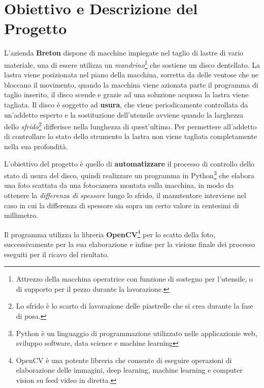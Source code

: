\documentclass[a4paper, notitlepage, 12pt]{article}
\begin{document}
    \section{Obiettivo e Descrizione  del Progetto}\par
        \noindent L'azienda \textbf{Breton} dispone di macchine impiegate nel taglio di lastre di vario materiale,
        una di essere utilizza un \emph{mandrino}\footnote[0]{\indent Attrezzo della macchina operatrice con funzione di sostegno per l'utensile, o di supporto per il pezzo durante la lavorazione.} che sostiene un disco dentellato.
        La lastra viene posizionata nel piano della macchina, sorretta da delle ventose che ne bloccano il movimento,
        quando la macchina viene azionata parte il programma di taglio inserito, il disco scende e grazie ad una
        soluzione acquosa la lastra viene tagliata. Il disco è soggetto ad \textbf{usura}, che viene periodicamente controllata da un'addetto esperto e la 
        sostituzione dell'utensile avviene quando la larghezza dello \emph{sfrido}\footnote[1]{\indent Lo sfrido è lo scarto di lavorazione delle piastrelle che si crea durante la fase di posa.} differisce
        nella lunghezza di quest'ultimo. Per permettere all'addetto di controllare lo stato dello strumento la lastra
        non viene tagliata completamente nella sua profondità.\par
        \noindent L'obiettivo del progetto è quello di \textbf{automatizzare} il processo di controllo dello stato di usura 
        del disco, quindi realizzare un programma in Python\footnote[2]{\indent Python è un linguaggio di programmazione utilizzato nelle applicazionie web, sviluppo software, data science e machine learning} che elabora una foto 
        scattata da una fotocamera montata sulla macchina, in modo da ottenere la \emph{differenza di spessore} lungo lo sfrido, 
        il manutentore interviene nel caso in cui la differenza di spessore sia sopra un certo valore in centesimi di millimetro.\par
        \noindent Il programma utilizza la libreria \textbf{OpenCV}\footnote[3]{\indent OpenCV è una potente libreria che consente di eseguire operazioni di elaborazione delle immagini, deep learning, machine learning e computer vision su feed video in diretta.} per lo scatto della foto, successivamente 
        per la sua elaborazione e infine per la visione finale dei processo eseguiti per il ricavo del risultato.
    \pagebreak
    \begin{abstract}
        \noindent \rule{\linewidth}{.6pt}\par
        
        \noindent \rule{\linewidth}{.6pt} 
    \end{abstract}    
\end{document}
